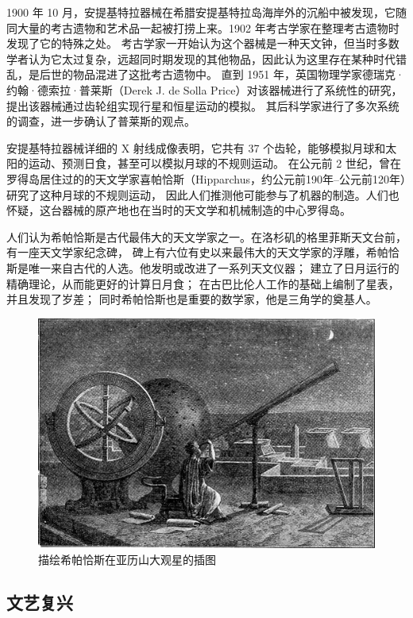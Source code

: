 \documentclass[a4paper,10.5pt]{book}
\begin{document}
1900 年 10 月，安提基特拉器械在希腊安提基特拉岛海岸外的沉船中被发现，它随同大量的考古遗物和艺术品一起被打捞上来。1902 年考古学家在整理考古遗物时发现了它的特殊之处。
考古学家一开始认为这个器械是一种天文钟，但当时多数学者认为它太过复杂，远超同时期发现的其他物品，因此认为这里存在某种时代错乱，是后世的物品混进了这批考古遗物中。
直到 1951 年，英国物理学家德瑞克·约翰·德索拉·普莱斯（Derek J. de Solla Price）对该器械进行了系统性的研究，提出该器械通过齿轮组实现行星和恒星运动的模拟。
其后科学家进行了多次系统的调查，进一步确认了普莱斯的观点。

安提基特拉器械详细的 X 射线成像表明，它共有 37 个齿轮，能够模拟月球和太阳的运动、预测日食，甚至可以模拟月球的不规则运动。
在公元前 2 世纪，曾在罗得岛居住过的的天文学家喜帕恰斯（Hipparchus，约公元前190年–公元前120年）研究了这种月球的不规则运动，
因此人们推测他可能参与了机器的制造。人们也怀疑，这台器械的原产地也在当时的天文学和机械制造的中心罗得岛。

人们认为希帕恰斯是古代最伟大的天文学家之一。在洛杉矶的格里菲斯天文台前，有一座天文学家纪念碑，
碑上有六位有史以来最伟大的天文学家的浮雕，希帕恰斯是唯一来自古代的人选。他发明或改进了一系列天文仪器；
建立了日月运行的精确理论，从而能更好的计算日月食； 在古巴比伦人工作的基础上编制了星表，并且发现了岁差；
同时希帕恰斯也是重要的数学家，他是三角学的奠基人。

\begin{figure}[ht]
\centering
\includegraphics[width=5.0in]{images/1_03-Observatory_in_Alexandria_at_the_Time_of_Hipparchus.jpg}
\caption{描绘希帕恰斯在亚历山大观星的插图}
\end{figure}

\subsection{文艺复兴}
\end{document}
